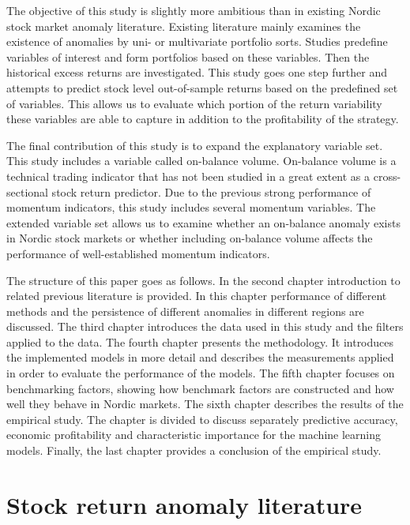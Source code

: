 \documentclass[12pt]{article}
\begin{document}
The objective of this study is slightly more ambitious than in existing Nordic stock market anomaly literature. Existing literature mainly examines the existence of anomalies by uni- or multivariate portfolio sorts. Studies predefine variables of interest and form portfolios based on these variables. Then the historical excess returns are investigated. This study goes one step further and attempts to predict stock level out-of-sample returns based on the predefined set of variables. This allows us to evaluate which portion of the return variability these variables are able to capture in addition to the profitability of the strategy. \par

The final contribution of this study is to expand the explanatory variable set. This study includes a variable called on-balance volume. On-balance volume is a technical trading indicator that has not been studied in a great extent as a cross-sectional stock return predictor. Due to the previous strong performance of momentum indicators, this study includes several momentum variables. The extended variable set allows us to examine whether an on-balance anomaly exists in Nordic stock markets or whether including on-balance volume affects the performance of well-established momentum indicators. \par

The structure of this paper goes as follows. In the second chapter introduction to related previous literature is provided. In this chapter performance of different methods and the persistence of different anomalies in different regions are discussed. The third chapter introduces the data used in this study and the filters applied to the data. The fourth chapter presents the methodology. It introduces the implemented models in more detail and describes the measurements applied in order to evaluate the performance of the models. The fifth chapter focuses on benchmarking factors, showing how benchmark factors are constructed and how well they behave in Nordic markets. The sixth chapter describes the results of the empirical study. The chapter is divided to discuss separately predictive accuracy, economic profitability and characteristic importance for the machine learning models. Finally, the last chapter provides a conclusion of the empirical study. \par

\section{Stock return anomaly literature}\label{StockReturnAnomalyLiterature}
\end{document}
